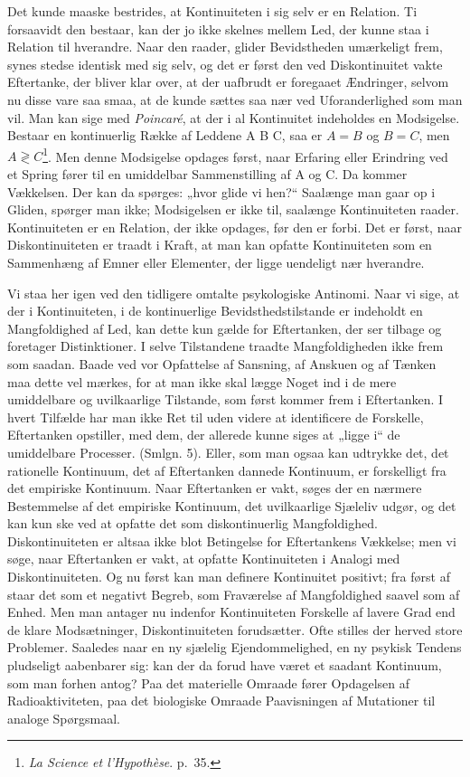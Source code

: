 \documentclass[12pt,a4paper]{book}
\newcommand{\opage}[1]{\marginnote{\footnotesize\textit{[#1]}}}
\newcommand{\apage}[1]{\marginnote{\footnotesize\textit{[#1]}}}
\begin{document}
Det kunde maaske bestrides, at Kontinuiteten i sig selv \apage{157} er en Relation. Ti
forsaavidt den bestaar, kan der jo ikke skelnes mellem Led, der kunne staa i
Relation til hverandre. Naar den raader, glider Bevidstheden umærkeligt
frem, synes stedse identisk med sig selv, og det er først den ved
Diskontinuitet vakte Eftertanke, der bliver klar over, at der uafbrudt er
foregaaet Ændringer, selvom nu disse vare saa smaa, at de kunde sættes saa
nær ved Uforanderlighed som man vil. Man kan sige med \emph{Poincaré}, at
der i al Kontinuitet indeholdes en Modsigelse. Bestaar en kontinuerlig Række
af Leddene A B C, saa er $A = B$ og $B = C$, men $A \gtrless
C$\footnote{\emph{La Science et l'Hypothèse}. p.~35.}. Men denne Modsigelse
opdages først, naar Erfaring eller Erindring ved et Spring fører til en
umiddelbar Sammenstilling af A og C. Da kommer Vækkelsen. Der kan da
spørges: „hvor glide vi hen?“ Saalænge man gaar op i Gliden, spørger man
ikke; Modsigelsen er ikke til, saalænge Kontinuiteten raader. Kontinuiteten
er en Relation, der ikke opdages, før den er forbi. Det er først, naar
Diskontinuiteten er traadt i Kraft, at man kan opfatte Kontinuiteten som en
Sammenhæng af Emner eller Elementer, der ligge uendeligt nær hverandre.

Vi staa her igen ved den tidligere omtalte psykologiske Antinomi. Naar vi
sige, at der i Kontinuiteten, i de kontinuerlige Bevidsthedstilstande er
indeholdt en Mangfoldighed af Led, kan dette kun gælde for Eftertanken, der
ser tilbage og foretager Distinktioner. I selve Tilstandene traadte
Mangfoldigheden ikke frem som saadan. Baade ved vor Opfattelse af Sansning,
af Anskuen og af Tænken maa dette vel mærkes, for at man ikke skal lægge
Noget ind i de mere umiddelbare og uvilkaarlige Tilstande, som først kommer
frem i Eftertanken. I hvert Tilfælde har man ikke Ret til uden videre at
identificere de Forskelle, Eftertanken opstiller, med dem, der allerede kunne
siges at „ligge i“ de umiddelbare Processer. (Smlgn. 5). Eller, som man
ogsaa kan udtrykke det, det rationelle Kontinuum, det af Eftertanken dannede
Kontinuum, er forskelligt fra det empiriske Kontinuum. Naar Eftertanken er
vakt, søges der en nærmere Bestemmelse af det empiriske Kontinuum, det
uvilkaarlige
\opage{158}Sjæleliv udgør, og det kan kun ske ved at opfatte det som
diskontinuerlig Mangfoldighed. Diskontinuiteten er altsaa ikke blot
Betingelse for Eftertankens Vækkelse; men vi søge, naar Eftertanken er
vakt, at opfatte Kontinuiteten i Analogi med Diskontinuiteten. Og nu først
kan man definere Kontinuitet positivt; fra først af staar det som et
negativt Begreb, som Fraværelse af Mangfoldighed saavel som af Enhed. Men
man antager nu indenfor Kontinuiteten Forskelle af lavere Grad end de klare
Modsætninger, Diskontinuiteten forudsætter. Ofte stilles der herved store
Problemer. Saaledes naar en ny sjælelig Ejendommelighed, en ny psykisk
Tendens pludseligt aabenbarer sig: kan der da forud have været et saadant
Kontinuum, som man forhen antog? Paa det materielle Omraade fører
Opdagelsen af Radioaktiviteten, paa det biologiske Omraade Paavisningen af
Mutationer til analoge Spørgsmaal.
\end{document}
